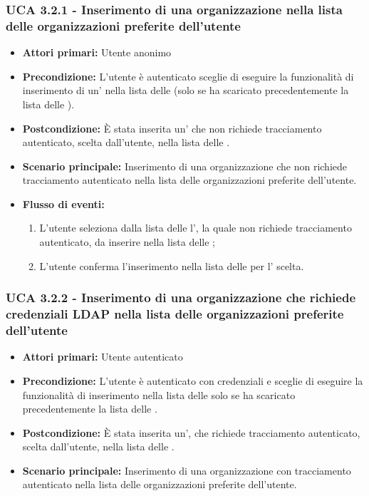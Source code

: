 \subsubsection{UCA 3.2.1 - Inserimento di una organizzazione nella lista delle organizzazioni preferite dell'utente}%
\begin{itemize}
	\item \textbf{Attori primari:} Utente anonimo
	\item \textbf{Precondizione:} L'utente è autenticato sceglie di eseguire la funzionalità di inserimento di un' nella lista delle  (solo se ha scaricato precedentemente la lista delle ).
	\item \textbf{Postcondizione:} È stata inserita un' che non richiede tracciamento autenticato, scelta dall'utente, nella lista delle .
	\item \textbf{Scenario principale:} Inserimento di una organizzazione che non richiede tracciamento autenticato nella lista delle organizzazioni preferite dell'utente.
	\item \textbf{Flusso di eventi:}
	\begin{enumerate}
		\item L'utente seleziona dalla lista delle  l', la quale non richiede tracciamento autenticato, da inserire nella lista delle ;
		\item L'utente conferma l'inserimento nella lista delle  per l' scelta.
	\end{enumerate}
\end{itemize}

\subsubsection{UCA 3.2.2 - Inserimento di una organizzazione che richiede credenziali LDAP nella lista delle organizzazioni preferite dell'utente}%
\begin{itemize}
	\item \textbf{Attori primari:} Utente autenticato
	\item \textbf{Precondizione:} L'utente è autenticato con credenziali  e sceglie di eseguire la funzionalità di inserimento nella lista delle  solo se ha scaricato precedentemente la lista delle .
	\item \textbf{Postcondizione:} È stata inserita un', che richiede tracciamento autenticato, scelta dall'utente, nella lista delle .
	\item \textbf{Scenario principale:} Inserimento di una organizzazione con tracciamento autenticato nella lista delle organizzazioni preferite dell'utente.
\end{itemize}

